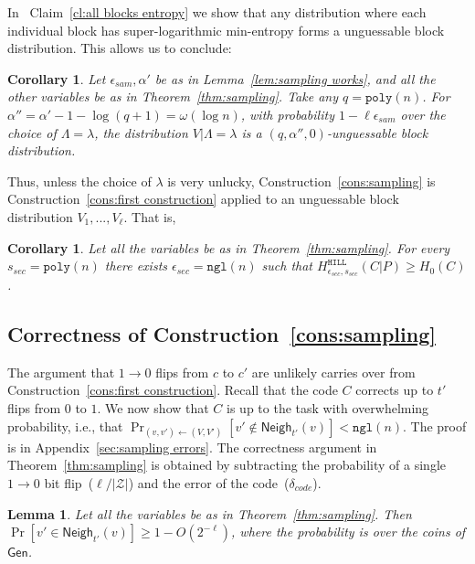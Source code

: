 \documentclass[11pt]{article}
\newcommand{\apref}[1]{\mbox{Appendix~\ref{#1}}}
\newcommand{\thref}[1]{\mbox{Theorem~\ref{#1}}}
\newcommand{\corref}[1]{\mbox{Corollary~\ref{#1}}}
\newcommand{\lemref}[1]{\mbox{Lemma~\ref{#1}}}
\newcommand{\clref}[1]{\mbox{Claim~\ref{#1}}}
\newcommand{\consref}[1]{\mbox{Construction~\ref{#1}}}
\newcommand{\class}[1]{{\ensuremath{\mathsf{#1}}}}
\newcommand{\gen}{\ensuremath{\class{Gen}}\xspace}
\newcommand{\neigh}{\ensuremath{\class{Neigh}}\xspace}
\newcommand{\hill}{\ensuremath{\mathtt{HILL}}\xspace}
\newcommand{\poly}{\ensuremath{\mathtt{poly}}\xspace}
\newcommand{\ngl}{\ensuremath{\mathtt{ngl}}\xspace}
\newtheorem{lemma}[theorem]{Lemma}
\newtheorem{corollary}[theorem]{Corollary}
\begin{document}
In ~\clref{cl:all blocks entropy} we show that any distribution where each individual block has super-logarithmic min-entropy forms a unguessable block distribution.  This allows us to conclude:
\begin{corollary}
\label{cor:v are unguessable}
Let $\epsilon_{sam}, \alpha'$ be as in \lemref{lem:sampling works},  and all the other variables be as in \thref{thm:sampling}. Take any $q=\poly(n)$.  For $\alpha'' =\alpha'-1-\log (q+1) =  \omega(\log n)$, with  probability $1-\ell \epsilon_{sam}$ over the choice of $\Lambda=\lambda$, the distribution $V| \Lambda=\lambda$ is a $(q, \alpha'', 0)$-unguessable block distribution.
\end{corollary}


Thus, unless the choice of $\lambda$ is very unlucky,
\consref{cons:sampling} is \consref{cons:first construction} applied to an unguessable block distribution $V_1,..., V_\ell$. That is, 
\begin{corollary}
\label{cor:samp unguess}
Let all the variables be as in \thref{thm:sampling}.
For every $s_{sec} = \poly(n)$ there exists $\epsilon_{sec} = \ngl(n)$ such that $H^{\hill}_{\epsilon_{sec}, s_{sec}}(C | P) \geq H_0(C)$. %
\end{corollary}

\subsection{Correctness of \consref{cons:sampling}}
\label{sec:correct sampling}
The argument that $1\rightarrow 0$ flips from $c$ to $c'$ are unlikely carries over from \consref{cons:first construction}.  Recall that the code $C$ corrects up to $t'$ flips from $0$ to $1$. We now show that $C$ is up to the task with overwhelming probability, i.e., that  $\Pr_{(v, v')\leftarrow (V, V')}[v'\not\in\neigh_{t'}(v)] <\ngl(n)$.  The proof is in \apref{sec:sampling errors}.  The correctness argument in \thref{thm:sampling} is obtained by subtracting the probability of a single $1\rightarrow 0$ bit flip~($\ell/|\mathcal{Z}|$) and the error of the code~($\delta_{code}$).

\begin{lemma}
\label{lem:sampling errors}
Let all the variables be as in \thref{thm:sampling}.
 Then $\Pr[v'\in\neigh_{t'}(v)]\geq 1-O(2^{-\ell})$, where the probability is over the coins of $\gen$.  %
\end{lemma}
\end{document}
